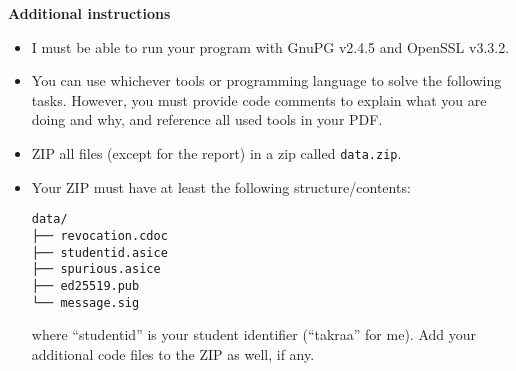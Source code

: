 \documentclass{homework}
\begin{document}
\textbf{Additional instructions}

\begin{itemize}
  \item I must be able to run your program with GnuPG v2.4.5 and OpenSSL v3.3.2\footnotemark{}.
  \item You can use whichever tools or programming language to solve the following tasks.
  However, you must provide code comments to explain what you are doing and why, and reference all used tools in your PDF.
  \item ZIP all files (except for the report) in a zip called \texttt{data.zip}.
  \item Your ZIP must have at least the following structure/contents:
  \begin{Verbatim}
data/
├── revocation.cdoc
├── studentid.asice
├── spurious.asice
├── ed25519.pub
└── message.sig
  \end{Verbatim}
  where \enquote{studentid} is your student identifier (\enquote{takraa} for me).
  Add your additional code files to the ZIP as well, if any.
\end{itemize}
\end{document}
